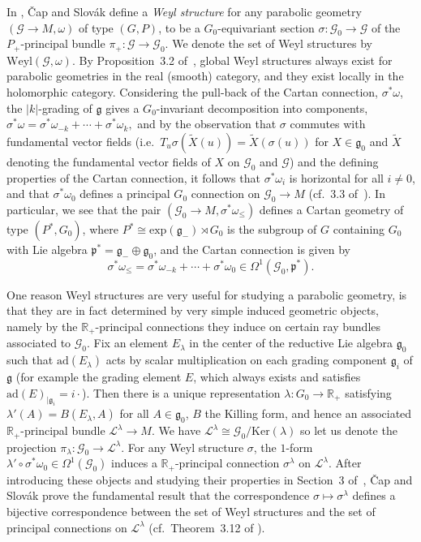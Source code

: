 \documentclass[11pt]{article}
\def\R{\mathbb{R}}
\def\g{\mathfrak{g}}
\def\p{\mathfrak{p}}
\def\Gbdle{\mathcal{G}}
\def\dsum{\oplus}
\def\isom{\cong}
\theoremstyle{plain}
\theoremstyle{definition}
\begin{document}
In \cite{CS03}, \v{C}ap and Slov\'ak def\/ine a \emph{Weyl structure} for any parabolic geometry $(\Gbdle \rightarrow M,\omega)$ of type $(G,P)$, to be a $G_0$-equivariant section $\sigma: \Gbdle_0 \rightarrow \Gbdle$ of the $P_+$-principal bundle $\pi_+:\Gbdle \rightarrow \Gbdle_0$. We denote the set of Weyl structures by $\mathrm{Weyl}(\Gbdle,\omega)$. By Proposition~3.2 of~\cite{CS03}, global Weyl structures always exist for parabolic geometries in the real (smooth) category, and they exist locally in the holomorphic category. Considering the pull-back of the Cartan connection, $\sigma^*\omega$, the $\vert k \vert$-grading of $\g$ gives a $G_0$-invariant decomposition into components, $\sigma^*\omega = \sigma^*\omega_{-k} + \cdots + \sigma^*\omega_k,$ and by the observation that $\sigma$ commutes with fundamental vector f\/ields (i.e.\ $T_u\sigma(\widetilde{X}(u)) = \widetilde{X}(\sigma(u))$ for $X \in \g_0$ and $\widetilde{X}$ denoting the fundamental vector f\/ields of $X$ on $\Gbdle_0$ and $\Gbdle$) and the def\/ining properties of the Cartan connection, it follows that $\sigma^*\omega_i$ is horizontal for all $i \neq 0$, and that $\sigma^*\omega_0$ def\/ines a principal $G_0$ connection on $\Gbdle_0 \rightarrow M$ (cf.~3.3 of~\cite{CS03}). In particular, we see that the pair $(\Gbdle_0 \rightarrow M,\sigma^*\omega_{\leq})$ def\/ines a Cartan geometry of type $(P^*,G_0)$, where $P^* \isom \mathrm{exp}(\g_-) \rtimes G_0$ is the subgroup of $G$ containing $G_0$ with Lie algebra $\p^* = \g_- \dsum \g_0$, and the Cartan connection is given by
\[
\sigma^*\omega_{\leq} = \sigma^*\omega_{-k} + \cdots + \sigma^*\omega_0 \in \Omega^1(\Gbdle_0,\p^*).
\]

One reason Weyl structures are very useful for studying a parabolic geometry, is that they are in fact determined by very simple induced geometric objects, namely by the $\R_+$-principal connections they induce on certain ray bundles associated to $\Gbdle_0$. Fix an element $E_{\lambda}$ in the center of the reductive Lie algebra $\g_0$ such that $\mathrm{ad}(E_{\lambda})$ acts by scalar multiplication on each grading component $\g_i$ of $\g$ (for example the grading element $E$, which always exists and satisf\/ies $\mathrm{ad}(E)_{\vert \g_i} = i \cdot$). Then there is a unique representation $\lambda: G_0 \rightarrow \R_+$ satisfying $\lambda'(A) = B(E_{\lambda},A)$ for all $A \in \g_0$, $B$ the Killing form, and hence an associated $\R_+$-principal bundle $\mathcal{L}^{\lambda} \rightarrow M$. We have $\mathcal{L}^{\lambda} \isom \Gbdle_0/\mathrm{Ker}(\lambda)$ so let us denote the projection $\pi_{\lambda}: \Gbdle_0 \rightarrow \mathcal{L}^{\lambda}$. For any Weyl structure $\sigma$, the $1$-form $\lambda' \circ \sigma^*\omega_0 \in \Omega^1(\Gbdle_0)$ induces a $\R_+$-principal connection $\sigma^{\lambda}$ on $\mathcal{L}^{\lambda}$. After introducing these objects and studying their properties in Section~3 of~\cite{CS03}, \v{C}ap and Slov\'ak prove the fundamental result that the correspondence $\sigma \mapsto \sigma^{\lambda}$ def\/ines a bijective correspondence between the set of Weyl structures and the set of principal connections on $\mathcal{L}^{\lambda}$ (cf.\ Theorem~3.12 of \cite{CS03}).
\end{document}
